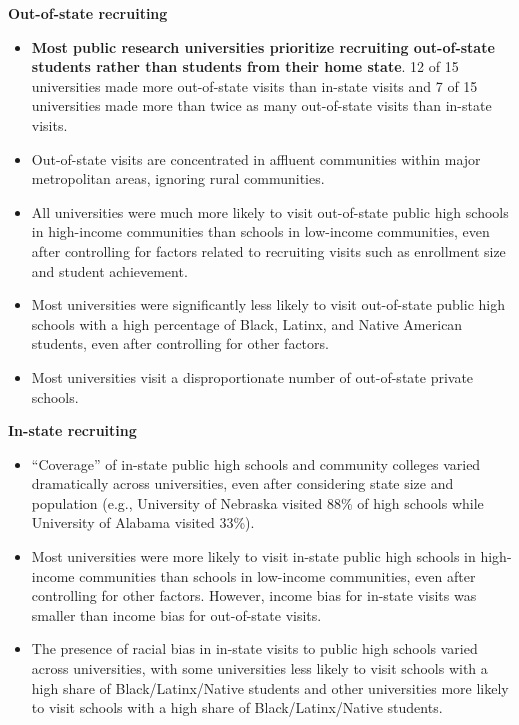 \documentclass[twoside]{article}
\begin{document}
\begin{color-block}[Findings]

\textbf{Out-of-state recruiting}
\begin{itemize}
    \item \textbf{Most public research universities prioritize recruiting out-of-state students rather than students from their home state}. 12 of 15 universities made more out-of-state visits than in-state visits and 7 of 15 universities made more than twice as many out-of-state visits than in-state visits.
    \item Out-of-state visits are concentrated in affluent communities within major metropolitan areas, ignoring rural communities.
    \item All universities were much more likely to visit out-of-state public high schools in high-income communities than schools in low-income communities, even after controlling for factors related to recruiting visits such as enrollment size and student achievement.
    \item Most universities were significantly less likely to visit out-of-state public high schools with a high percentage of Black, Latinx, and Native American students, even after controlling for other factors.
    \item Most universities visit a disproportionate number of out-of-state private schools.
\end{itemize}

\textbf{In-state recruiting}
\begin{itemize}
    \item ``Coverage'' of in-state public high schools and community colleges varied dramatically across universities, even after considering state size and population (e.g., University of Nebraska visited 88\% of high schools while University of Alabama visited 33\%).
    \item Most universities were more likely to visit in-state public high schools in high-income communities than schools in low-income communities, even after controlling for other factors. However, income bias for in-state visits was smaller than income bias for out-of-state visits.
    \item The presence of racial bias in in-state visits to public high schools varied across universities, with some universities less likely to visit schools with a high share of Black/Latinx/Native students and other universities more likely to visit schools with a high share of Black/Latinx/Native students.
\end{itemize}  


\end{color-block}
\end{document}
